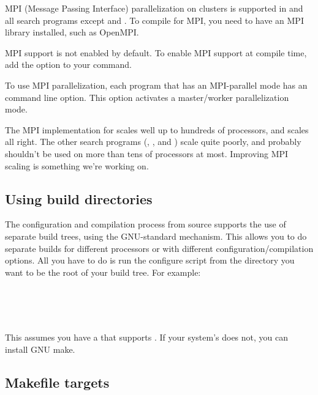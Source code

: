 MPI (Message Passing Interface) parallelization on clusters is
supported in  and all search programs except  and
. To compile for MPI, you need to have an MPI library
installed, such as OpenMPI.

MPI support is not enabled by default.  To enable MPI support at
compile time, add the  option to your
 command.

To use MPI parallelization, each program that has an MPI-parallel mode
has an  command line option. This option activates a
master/worker parallelization mode.

The MPI implementation for  scales well up to hundreds
of processors, and  scales all right. The other search
programs (, , and ) scale
quite poorly, and probably shouldn't be used on more than tens of
processors at most. Improving MPI scaling is something we're working on.


\subsection{Using build directories}

The configuration and compilation process from source supports the use
of separate build trees, using the GNU-standard 
mechanism. This allows you to do separate builds for different
processors or with different configuration/compilation options. All
you have to do is run the configure script from the directory you want
to be the root of your build tree.  For example:

  \vspace{1ex}
  \\
  \\
  \\
  \vspace{1ex}

This assumes you have a  that supports . If your
system's  does not, you can install GNU make.


\subsection{Makefile targets}

